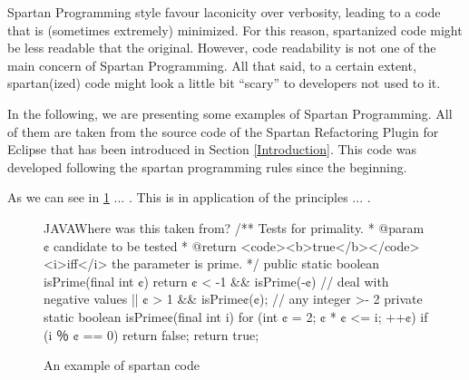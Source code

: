 Spartan Programming style favour laconicity over verbosity, leading to 
a code that is (sometimes extremely) minimized. For this reason, spartanized code might 
be less readable that the original. However, code readability is not one of 
the main concern of Spartan Programming. All that said, to a certain extent, 
spartan(ized) code might look a little bit ``scary'' to developers not used to it.

In the following, we are presenting some examples of Spartan Programming.
All of them are taken from the source code of the Spartan Refactoring 
Plugin for Eclipse that has been introduced in Section \ref{Introduction}. 
This code was developed following the spartan programming rules since 
the beginning.



% 
% 

As we can see in \cref{figure:shock-2} ... . This is 
in application of the principles ... .

\begin{figure}[h]
\label{figure:shock-2}
\caption{An example of spartan code}
\begin{Code}{JAVA}{Where was this taken from?}
/** Tests for primality.
  * @param ¢ candidate to be tested
  * @return <code><b>true</b></code> <i>iff</i> the parameter is prime. */
public static boolean isPrime(final int ¢) {
  return ¢ < -1 && isPrime(-¢) // deal with negative values
      || ¢ > 1 && isPrime¢(¢); // any integer >- 2
}
private static boolean isPrime¢(final int i) {
  for (int ¢ = 2; ¢ * ¢ <= i; ++¢)
    if (i ％ ¢ == 0)
      return false;
  return true;
}
\end{Code}
\end{figure}

